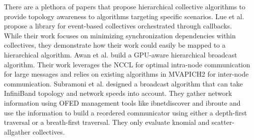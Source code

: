 There are a plethora of papers that propose hierarchical collective algorithms to provide topology awareness to algorithms targeting specific scenarios.
Lue et al. \cite{Luo2018ADAPT} propose a library for event-based collectives orchestrated through callbacks.
While their work focuses on minimizing synchronization dependencies within collectives, they demonstrate how their work could easily be mapped to a hierarchical algorithm.
Awan et al. \cite{Awan2016NCCLBcast} build a \gls{GPU}-aware hierarchical broadcast algorithm.
Their work leverages the \gls{NCCL} for optimal intra-node communication for large messages and relies on existing algorithms in MVAPICH2 for inter-node communication.
Subramoni et al. \cite{Subramoni2011SpeedAwareBcast} designed a broadcast algorithm that can take InfiniBand topology and network speeds into account.
They gather network information using \gls{OFED} management tools like ibnetdiscover and ibroute and use the information to build a reordered communicator using either a depth-first traversal or a breath-first traversal.
They only evaluate knomial and scatter-allgather collectives.

